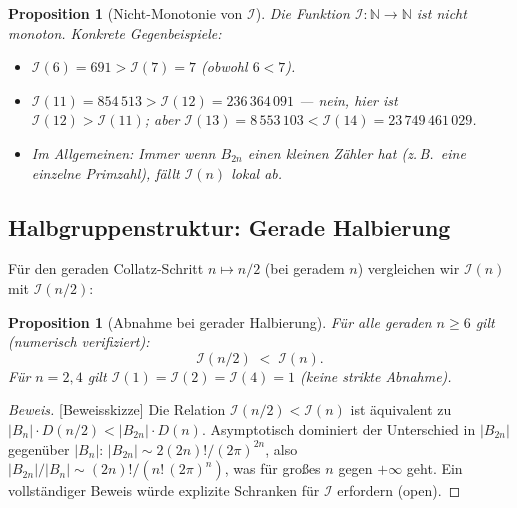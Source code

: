 \documentclass[12pt,a4paper]{article}
\newtheorem{proposition}[definition]{Proposition}
\newenvironment{beweis}{\begin{proof}[Beweis]}{\end{proof}}
\newcommand{\N}{\mathbb{N}}
\newcommand{\abs}[1]{\lvert#1\rvert}
\newcommand{\In}{\mathcal{I}}      %
\newcommand{\Denom}[1]{D(#1)}     %
\begin{document}
\begin{proposition}[Nicht-Monotonie von $\In$]
\label{prop:nicht-monoton}
Die Funktion $\In\colon \N \to \N$ ist \emph{nicht monoton}. Konkrete Gegenbeispiele:
\begin{itemize}[noitemsep]
  \item $\In(6) = 691 > \In(7) = 7$ (obwohl $6 < 7$).
  \item $\In(11) = 854\,513 > \In(12) = 236\,364\,091$ --- nein, hier ist
    $\In(12) > \In(11)$; aber $\In(13) = 8\,553\,103 < \In(14) = 23\,749\,461\,029$.
  \item Im Allgemeinen: Immer wenn $B_{2n}$ einen kleinen Zähler hat (z.\,B.\ eine
    einzelne Primzahl), fällt $\In(n)$ lokal ab.
\end{itemize}
\end{proposition}

\subsection{Halbgruppenstruktur: Gerade Halbierung}

Für den geraden Collatz-Schritt $n \mapsto n/2$ (bei geradem $n$) vergleichen wir
$\In(n)$ mit $\In(n/2)$:

\begin{proposition}[Abnahme bei gerader Halbierung]
\label{prop:halbierung}
Für alle geraden $n \geq 6$ gilt (numerisch verifiziert):
\[
  \In(n/2) \;<\; \In(n).
\]
Für $n = 2, 4$ gilt $\In(1) = \In(2) = \In(4) = 1$ (keine strikte Abnahme).
\end{proposition}

\begin{beweis}[Beweisskizze]
Die Relation $\In(n/2) < \In(n)$ ist äquivalent zu
$\abs{B_n} \cdot \Denom{n/2} < \abs{B_{2n}} \cdot \Denom{n}$.
Asymptotisch dominiert der Unterschied in $\abs{B_{2n}}$ gegenüber $\abs{B_n}$:
$\abs{B_{2n}} \sim 2(2n)!/(2\pi)^{2n}$, also $\abs{B_{2n}}/\abs{B_n} \sim
(2n)!/(n!\,(2\pi)^n)$, was für großes $n$ gegen $+\infty$ geht.
Ein vollständiger Beweis würde explizite Schranken für $\In$ erfordern (open).
\end{beweis}
\end{document}
